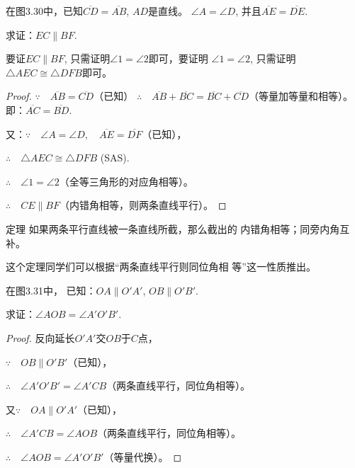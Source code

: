 \begin{example}
    在图3.30中，已知$\overline{CD}=\overline{AB}$, $AD$是直线。
$\angle A=\angle D$, 并且$\overline{AE}=\overline{DE}$.

求证：$EC\parallel BF$.

\end{example}

\begin{analyze}
要证$EC\parallel BF$, 只需证明$\angle 1=\angle 2$即可，要证明
$\angle 1=\angle 2$, 只需证明$\triangle AEC\cong \triangle DFB$即可。
\end{analyze}

\begin{proof}
    $\because\quad \overline{AB}=\overline{CD}$（已知）
    $\therefore\quad \overline{AB}+\overline{BC}=\overline{BC}+\overline{CD}$（等量加等量和相等）。即：$\overline{AC}=\overline{BD}$.

又：$\because\quad \angle A=\angle D,\quad \overline{AE}=\overline{DF}$（已知），

$\therefore\quad \triangle AEC\cong \triangle DFB$ (SAS).

$\therefore\quad \angle 1=\angle 2$（全等三角形的对应角相等）。

$\therefore\quad CE\parallel BF$（内错角相等，则两条直线平行）。
\end{proof}

\begin{blk}
  {定理} 如果两条平行直线被一条直线所截，那么截出的
内错角相等；同旁内角互补。  
\end{blk}

这个定理同学们可以根据“两条直线平行则同位角相
等”这一性质推出。

\begin{example}
     在图3.31中，
已知：$OA\parallel O'A'$, $OB\parallel O'B'$.

求证：$\angle AOB=\angle A'O'B'$.   
\end{example}

\begin{proof}
    反向延长$O'A'$交$OB$于$C$点，

$\because\quad OB\parallel O'B'$（已知），

$\therefore\quad\angle A'O'B'=\angle A'CB$（两条直线平行，同位角相等）。

又$\because\quad OA\parallel O'A'$（已知），

$\therefore\quad \angle A'CB=\angle AOB$（两条直线平行，同位角相等）。

$\therefore\quad \angle AOB=\angle A'O'B'$（等量代换）。
\end{proof}

